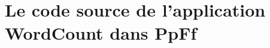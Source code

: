 
\chapter{Le code source de l'application WordCount dans PpFf}
\label{sourceCodeWordCountPpFf.ann}



\newpage
